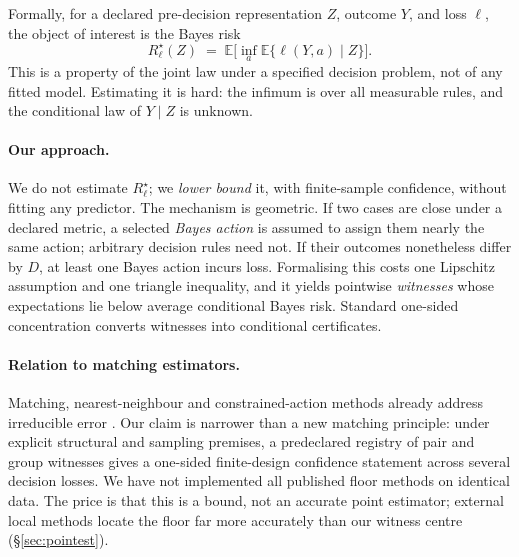 \documentclass[11pt]{article}
\theoremstyle{definition}
\newcommand{\risk}{R^{\star}}
\newcommand{\E}{\mathbb{E}}
\begin{document}
Formally, for a declared pre-decision representation $Z$, outcome $Y$, and loss $\ell$, the object of interest is the Bayes risk
\begin{equation}
\risk_\ell(Z) \;=\; \E\Big[\inf_a \E\{\ell(Y,a)\mid Z\}\Big].
\label{eq:bayes}
\end{equation}
This is a property of the joint law under a specified decision problem, not of any fitted model. Estimating it is hard: the infimum is over all measurable rules, and the conditional law of $Y\mid Z$ is unknown.

\paragraph{Our approach.} We do not estimate $\risk_\ell$; we \emph{lower bound} it, with finite-sample confidence, without fitting any predictor. The mechanism is geometric. If two cases are close under a declared metric, a selected \emph{Bayes action} is assumed to assign them nearly the same action; arbitrary decision rules need not. If their outcomes nonetheless differ by $D$, at least one Bayes action incurs loss. Formalising this costs one Lipschitz assumption and one triangle inequality, and it yields pointwise \emph{witnesses} whose expectations lie below average conditional Bayes risk. Standard one-sided concentration converts witnesses into conditional certificates.

\paragraph{Relation to matching estimators.} Matching, nearest-neighbour and constrained-action methods already address irreducible error \citep{devroye,rice,anderson}. Our claim is narrower than a new matching principle: under explicit structural and sampling premises, a predeclared registry of pair and group witnesses gives a one-sided finite-design confidence statement across several decision losses. We have not implemented all published floor methods on identical data. The price is that this is a bound, not an accurate point estimator; external local methods locate the floor far more accurately than our witness centre (\S\ref{sec:pointest}).
\end{document}
